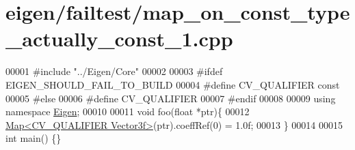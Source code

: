 \hypertarget{eigen_2failtest_2map__on__const__type__actually__const__1_8cpp_source}{}\section{eigen/failtest/map\+\_\+on\+\_\+const\+\_\+type\+\_\+actually\+\_\+const\+\_\+1.cpp}
\label{eigen_2failtest_2map__on__const__type__actually__const__1_8cpp_source}

\begin{DoxyCode}
00001 \textcolor{preprocessor}{#include "../Eigen/Core"}
00002 
00003 \textcolor{preprocessor}{#ifdef EIGEN\_SHOULD\_FAIL\_TO\_BUILD}
00004 \textcolor{preprocessor}{#define CV\_QUALIFIER const}
00005 \textcolor{preprocessor}{#else}
00006 \textcolor{preprocessor}{#define CV\_QUALIFIER}
00007 \textcolor{preprocessor}{#endif}
00008 
00009 \textcolor{keyword}{using namespace }\hyperlink{namespace_eigen}{Eigen};
00010 
00011 \textcolor{keywordtype}{void} foo(\textcolor{keywordtype}{float} *ptr)\{
00012     \hyperlink{group___core___module_class_eigen_1_1_map}{Map<CV\_QUALIFIER Vector3f>}(ptr).coeffRef(0) = 1.0f;
00013 \}
00014 
00015 \textcolor{keywordtype}{int} main() \{\}
\end{DoxyCode}
